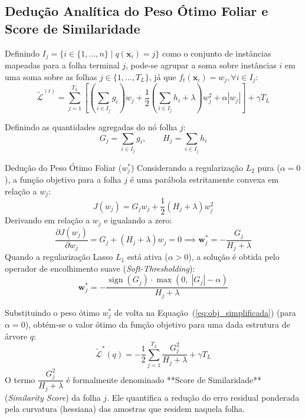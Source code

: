 \documentclass[11pt,a4paper]{article}
\begin{document}
\subsection{Dedução Analítica do Peso Ótimo Foliar e Score de Similaridade}
Definindo $I_j = \{ i \in \{1, \dots, n\} \mid q(\mathbf{x}_i) = j \}$ como o conjunto de instâncias mapeadas para a folha terminal $j$, pode-se agrupar a soma sobre instâncias $i$ em uma soma sobre as folhas $j \in \{1, \dots, T_L\}$, já que $f_t(\mathbf{x}_i) = w_j, \forall i \in I_j$:
\begin{equation}
  \tilde{\mathcal{L}}^{(t)} = \sum_{j=1}^{T_L} \left[ \left( \sum_{i \in I_j} g_i \right) w_j + \frac{1}{2} \left( \sum_{i \in I_j} h_i + \lambda \right) w_j^2 + \alpha |w_j| \right] + \gamma T_L
\end{equation}

Definindo as quantidades agregadas do nó folha $j$:
\begin{equation}
  G_j = \sum_{i \in I_j} g_i, \qquad H_j = \sum_{i \in I_j} h_i
  \label{eq:G_H_agregados}
\end{equation}

\begin{mathBox}{Dedução do Peso Ótimo Foliar ($w_j^*$)}
Considerando a regularização $L_2$ pura ($\alpha = 0$), a função objetivo para a folha $j$ é uma parábola estritamente convexa em relação a $w_j$:
\begin{equation}
  J(w_j) = G_j w_j + \frac{1}{2} (H_j + \lambda) w_j^2
\end{equation}
Derivando em relação a $w_j$ e igualando a zero:
\begin{equation}
  \frac{\partial J(w_j)}{\partial w_j} = G_j + (H_j + \lambda) w_j = 0 \implies \mathbf{w}_j^* = -\frac{G_j}{H_j + \lambda}
  \label{eq:peso_otimo_l2}
\end{equation}
Quando a regularização Lasso $L_1$ está ativa ($\alpha > 0$), a solução é obtida pelo operador de encolhimento suave (\textit{Soft-Thresholding}):
\begin{equation}
  \mathbf{w}_j^* = -\frac{\operatorname{sign}(G_j) \cdot \max(0, \; |G_j| - \alpha)}{H_j + \lambda}
  \label{eq:peso_otimo_l1_l2}
\end{equation}
\end{mathBox}

Substituindo o peso ótimo $w_j^*$ de volta na Equação~(\ref{eq:obj_simplificada}) (para $\alpha = 0$), obtém-se o valor ótimo da função objetivo para uma dada estrutura de árvore $q$:
\begin{equation}
  \tilde{\mathcal{L}}^*(q) = -\frac{1}{2} \sum_{j=1}^{T_L} \frac{G_j^2}{H_j + \lambda} + \gamma T_L
  \label{eq:score_arvore}
\end{equation}
O termo $\dfrac{G_j^2}{H_j + \lambda}$ é formalmente denominado **Score de Similaridade** (\textit{Similarity Score}) da folha $j$. Ele quantifica a redução do erro residual ponderada pela curvatura (hessiana) das amostras que residem naquela folha.
\end{document}
